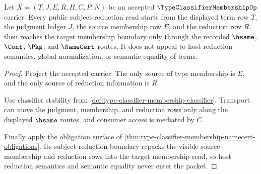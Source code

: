 \begin{theorem}
\label{thm:type-classifier-membership-subject-reduction-boundary}
Let $X=(T,J,E,R,H,C,P,N)$ be an accepted $\TypeClassifierMembershipUp$ carrier. Every public subject-reduction read starts from the displayed term row $T$, the judgment ledger $J$, the source membership row $E$, and the reduction row $R$, then reaches the target membership boundary only through the recorded $\hsame$, $\Cont$, $\Pkg$, and $\NameCert$ routes. It does not appeal to host reduction semantics, global normalization, or semantic equality of terms.
\end{theorem}
\begin{proof}
Project the accepted carrier. The only source of type membership is $E$, and the only source of reduction information is $R$.

Use classifier stability from \autoref{def:type-classifier-membership-classifier}. Transport can move the judgment, membership, and reduction rows only along the displayed $\hsame$ routes, and consumer access is mediated by $C$.

Finally apply the obligation surface of \autoref{thm:type-classifier-membership-namecert-obligations}. Its subject-reduction boundary repacks the visible source membership and reduction rows into the target membership read, so host reduction semantics and semantic equality never enter the packet.
\end{proof}

